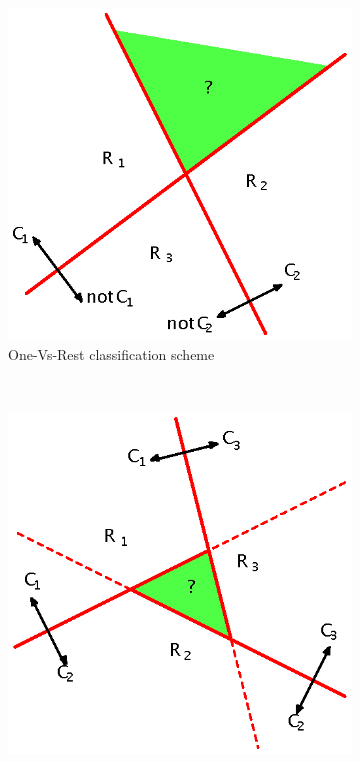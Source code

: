 \begin{figure}[h]
    \centering
    \begin{subfigure}[b]{0.4\textwidth}
        \includegraphics[width=\textwidth]{img/Bishop2006aa-p182-ch4-fig4-1-a.eps}
        \caption{One-Vs-Rest classification scheme}
        \label{fig:Bishop2006aa-p182-ch4-fig4-1-a}
    \end{subfigure}
    ~ %
    \begin{subfigure}[b]{0.4\textwidth}
        \includegraphics[width=\textwidth]{img/Bishop2006aa-p182-ch4-fig4-1-b.eps}

\end{subfigure}
\end{figure}
